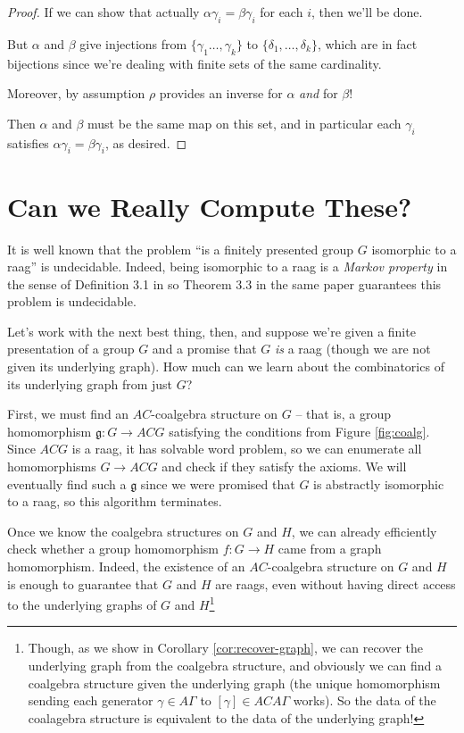 \documentclass[12pt]{article}
\theoremstyle{definition}
\theoremstyle{theorem}
\begin{document}
\begin{proof}
    If we can show that actually $\alpha \gamma_i = \beta \gamma_i$ for each $i$,
    then we'll be done.

    But $\alpha$ and $\beta$ give injections from $\{ \gamma_1 \ldots, \gamma_k \}$
    to $\{ \delta_1, \ldots, \delta_k \}$, which are in fact bijections since we're
    dealing with finite sets of the same cardinality. 

    Moreover, by assumption $\rho$ provides an inverse for $\alpha$ \emph{and} 
    for $\beta$!

    Then $\alpha$ and $\beta$ must be the same map on this set, and in particular
    each $\gamma_i$ satisfies $\alpha \gamma_i = \beta \gamma_i$, as desired.
\end{proof}

\section{Can we Really Compute These?}
\label{computing}

It is well known that the problem 
``is a finitely presented group $G$ isomorphic to a raag'' 
is undecidable. Indeed, being isomorphic to a raag is a 
\emph{Markov property} in the sense of Definition 3.1 in \cite{millerDecisionProblemsGroups1992}
so Theorem 3.3 in the same paper guarantees this problem is undecidable.

Let's work with the next best thing, then, and suppose we're given a 
finite presentation of a group $G$ and a promise that $G$ \emph{is} a raag 
(though we are not given its underlying graph). How much can we learn 
about the combinatorics of its underlying graph from just $G$?

First, we must find an $AC$-coalgebra structure on $G$ -- that is, a group 
homomorphism $\mathfrak{g} : G \to ACG$ satisfying the conditions from 
Figure \ref{fig:coalg}. Since $ACG$ is a raag, it has solvable word problem, so 
we can enumerate all homomorphisms $G \to ACG$ and check if they satisfy the 
axioms. We will eventually find such a $\mathfrak{g}$ since we were 
promised that $G$ is abstractly isomorphic to a raag, so this algorithm 
terminates. 

Once we know the coalgebra structures on $G$ and $H$, we can already 
efficiently check whether a group homomorphism $f : G \to H$ came from a 
graph homomorphism. Indeed, the existence of an $AC$-coalgebra 
structure on $G$ and $H$ is enough to guarantee that $G$ and $H$ are 
raags, even without having direct access to the underlying graphs of 
$G$ and $H$\footnote{Though, as we show in Corollary \ref{cor:recover-graph},
we can recover the underlying graph from the coalgebra structure, and obviously we 
can find a coalgebra structure given the underlying graph 
(the unique homomorphism sending each generator $\gamma \in A\Gamma$ to 
$[\gamma] \in ACA\Gamma$ works). So the data of the coalagebra structure 
is equivalent to the data of the underlying graph!}
\end{document}

